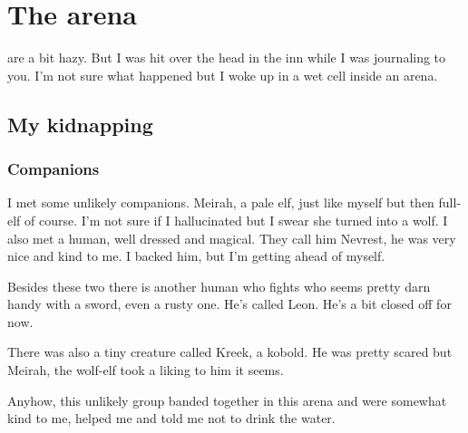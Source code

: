 
\chapter{The arena}
\label{diary__arena}

 are a bit hazy. But I was hit over the head in the inn while I was journaling to you. I'm not sure what happened but I woke up in a wet cell inside an arena.

\section{My kidnapping}

\subsection*{Companions}

I met some unlikely companions. Meirah, a pale elf, just like myself but then full-elf of course. I'm not sure if I hallucinated but I swear she turned into a wolf. I also met a human, well dressed and magical. They call him Nevrest, he was very nice and kind to me. I backed him, but I'm getting ahead of myself.

Besides these two there is another human who fights who seems pretty darn handy with a sword, even a rusty one. He's called Leon. He's a bit closed off for now.

There was also a tiny creature called Kreek, a kobold. He was pretty scared but Meirah, the wolf-elf took a liking to him it seems.

Anyhow, this unlikely group banded together in this arena and were somewhat kind to me, helped me and told me not to drink the water.

